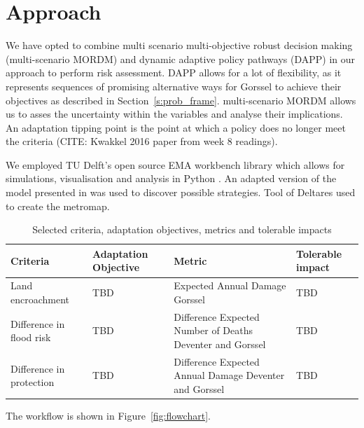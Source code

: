 \section{Approach}
\label{s:approach}



We have opted to combine multi scenario multi-objective robust decision making (multi-scenario MORDM) and dynamic adaptive policy pathways (DAPP) in our approach to perform risk assessment. DAPP allows for a lot of flexibility, as it represents sequences of promising alternative ways for Gorssel to achieve their objectives as described in Section~\ref{s:prob_frame}. multi-scenario MORDM allows us to asses the uncertainty within the variables and analyse their implications. An adaptation tipping point is the point at which a policy does no longer meet the criteria (CITE: Kwakkel 2016 paper from week 8 readings).

We employed TU Delft's open source EMA workbench library which allows for simulations, visualisation and analysis in Python \parencite{kwakkel_exploratory_2017}. An adapted version of the model presented in  was used to discover possible strategies. Tool of Deltares used to create the metromap.

\begin{longtable}[c]{p{2cm}p{2cm}p{5cm}l}
\caption{Selected criteria, adaptation objectives, metrics and tolerable impacts}
\label{tab:criteria}\\
\textbf{Criteria}        & \textbf{Adaptation Objective} & \textbf{Metric}                                           & \textbf{Tolerable impact} \\
\hline
\endfirsthead
%
\endhead
%
Land encroachment & TBD & Expected Annual Damage Gorssel & TBD \\
Difference in flood risk & TBD & Difference Expected Number of Deaths Deventer and Gorssel & TBD\\
Difference in protection & TBD & Difference Expected Annual Damage Deventer and Gorssel & TBD
\end{longtable}

The workflow is shown in Figure~\ref{fig:flowchart}.
